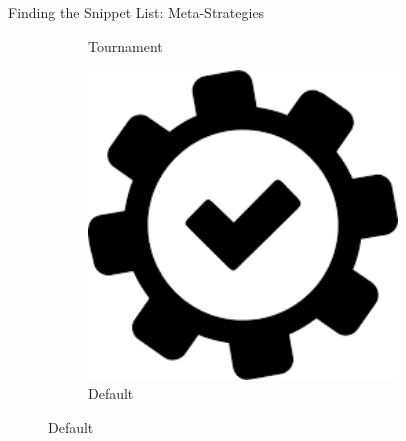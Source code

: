 \documentclass{beamer}
\begin{document}
\begin{frame}{Finding the Snippet List: Meta-Strategies}
\begin{figure}
\begin{subfigure}[b]{0.25\textwidth}
            \caption{Tournament}
        \end{subfigure}
        \hfill
        \begin{subfigure}[b]{0.25\textwidth}
            \centering
            \includegraphics[width=0.9\textwidth]{images/default.png}
            \caption{Default}
        \end{subfigure}
        \hspace*{0.5cm} 
    \end{figure}
\end{frame}
\end{document}
